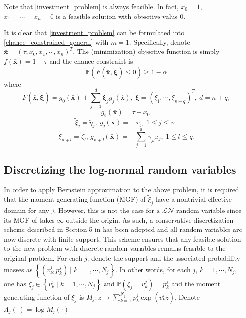 \documentclass[10pt]{article}
\theoremstyle{definition}
\theoremstyle{plain}
\begin{document}
Note that \eqref{investment_problem} is always feasible. In fact, $x_0=1$, $x_1=\cdots=x_n=0$ is a feasible solution with objective value $0$.

It is clear that \eqref{investment_problem} can be formulated into \eqref{chance_constrained_general} with $m=1$. Specifically, denote $\bar{\boldsymbol{x}} = \left(\tau, x_0, x_1, \cdots, x_n\right)^T$. The (minimization) objective function is simply $f(\bar{\boldsymbol{x}}) = 1-\tau$ and the chance constraint is \[\mathbb{P}\left(F\left(\bar{\boldsymbol{x}}, \tilde{ \boldsymbol\xi} \right) \leq 0 \right) \geq 1-\alpha\] where \[F\left(\bar{\boldsymbol{x}},\tilde{\boldsymbol{\xi}}\right) =g_0(\bar{\boldsymbol{x}}) + \sum_{j=1}^d \boldsymbol{\xi}_j g_j(\bar{\boldsymbol{x}}),\ \tilde{\boldsymbol{\xi}} = \left(\tilde{\xi}_1, \cdots, \tilde\xi_{n+q}\right)^T,\ d = n+q,\]
\[g_0(\bar{\boldsymbol{x}}) = \tau - x_0.\]
\[\tilde{\xi}_j = \tilde{\eta}_j,\ g_j(\bar{\boldsymbol{x}}) = -x_j,\ 1\leq j \leq n,\] 
\[\tilde{\xi}_{n+l} = \tilde{\zeta}_l,\ g_{n+l}(\bar{\boldsymbol{x}}) = -\sum_{j=1}^n \gamma_{jl}x_j,\ 1\leq l \leq q.\]

\subsection{Discretizing the log-normal random variables}
In order to apply Bernstein approximation to the above problem, it is required that the moment generating function (MGF) of $\tilde{\xi}_j$ have a nontrivial effective domain for any $j$. However, this is not the case for a $\mathcal{LN}$ random variable since its MGF of takes $\infty$ outside the origin. As such, a conservative discretization scheme described in Section 5 in \cite{Nemirovsky_and_Shapiro} has been adopted and all random variables are now discrete with finite support. This scheme ensures that any feasible solution to the new problem with discrete random variables remains feasible to the original problem. For each $j$, denote the support and the associated probability masses as $\left\{(v_k^j, p_k^j)\mid k = 1,\cdots, N_j \right\}$. In other words, for each $j$, $k=1, \cdots, N_j$, one has $\xi_j \in \left\{v_k^j \mid k=1,\cdots, N_j \right\}$ and $\mathbb{P}\left(\xi_j = v_k^j\right) = p_k^j$ and the moment generating function of $\xi_j$ is $M_j: z \rightarrow \sum_{k=1}^{N_j} p_k^j \exp \left(v_k^j z\right)$. Denote $\Lambda_j(\cdot) = \log M_j(\cdot)$.
\end{document}
